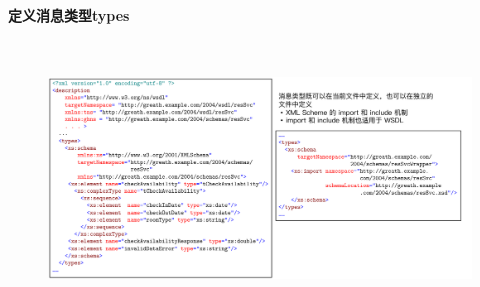 \paragraph*{定义消息类型types}~{} \par
\begin{figure}[H]
    \vspace{-0.5em}
	\centering
	\includegraphics[width=\textwidth]{images/定义消息类型.pdf}
    \vspace{-3em}
\end{figure}

